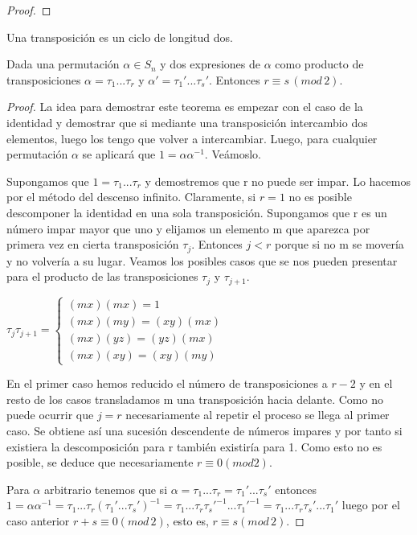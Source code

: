 \begin{proof}

\end{proof}

\begin{ndef}[Transposición]
Una transposición es un ciclo de longitud dos.
\end{ndef}

\begin{nth}\label{theorem:paridad-permutacion} 
Dada una permutación $\alpha \in S_n$ y dos expresiones de $\alpha$ como producto de transposiciones $\alpha = \tau_1...\tau_r$ y $\alpha' = \tau_1'...\tau_s'$. Entonces $r \equiv s \, (mod \, 2)$.
\end{nth}

\begin{proof}
La idea para demostrar este teorema es empezar con el caso de la identidad y demostrar que si mediante una transposición intercambio dos elementos, luego los tengo que volver a intercambiar. Luego, para cualquier permutación $\alpha$ se aplicará que $1 = \alpha\alpha^{-1}$. Veámoslo.

Supongamos que $1 = \tau_1...\tau_r$ y demostremos que r no puede ser impar. Lo hacemos por el método del descenso infinito. Claramente, si $r = 1$ no es posible descomponer la identidad en una sola transposición. Supongamos que r es un número impar mayor que uno y elijamos un elemento m que aparezca por primera vez en cierta transposición $\tau_j$. Entonces $j < r$ porque si no m se movería y no volvería a su lugar. Veamos los posibles casos que se nos pueden presentar para el producto de las transposiciones $\tau_j$ y $\tau_{j+1}$.

$\tau_j\tau_{j+1}=
\begin{cases}
(mx)(mx) = 1 \\
(mx)(my) = (xy)(mx) \\
(mx)(yz) = (yz)(mx) \\
(mx)(xy) = (xy)(my)
\end{cases}$

En el primer caso hemos reducido el número de transposiciones a $r-2$ y en el resto de los casos transladamos m una transposición hacia delante. Como no puede ocurrir que $j = r$ necesariamente al repetir el proceso se llega al primer caso. Se obtiene así una sucesión descendente de números impares y por tanto si existiera la descomposición para r también existiría para 1. Como esto no es posible, se deduce que necesariamente $r \equiv 0 (mod 2)$.

Para $\alpha$ arbitrario tenemos que si $\alpha = \tau_1...\tau_r = \tau_1'...\tau_s'$ entonces $1 = \alpha\alpha^{-1} = \tau_1...\tau_r(\tau_1'...\tau_s')^{-1} = \tau_1...\tau_r\tau_s'^{-1}...\tau_1'^{-1} = \tau_1...\tau_r\tau_s'...\tau_1'$ luego por el caso anterior $r+s \equiv 0 (mod \, 2)$, esto es, $r \equiv s (mod \, 2)$.
\end{proof}

